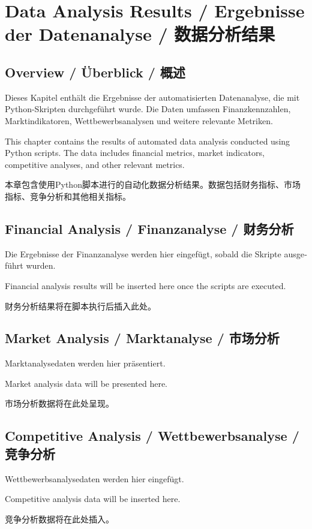 \chapter{Data Analysis Results / Ergebnisse der Datenanalyse / 数据分析结果}

\section{Overview / Überblick / 概述}

\begin{otherlanguage}{ngerman}
Dieses Kapitel enthält die Ergebnisse der automatisierten Datenanalyse, die mit Python-Skripten durchgeführt wurde. Die Daten umfassen Finanzkennzahlen, Marktindikatoren, Wettbewerbsanalysen und weitere relevante Metriken.
\end{otherlanguage}

This chapter contains the results of automated data analysis conducted using Python scripts. The data includes financial metrics, market indicators, competitive analyses, and other relevant metrics.

本章包含使用Python脚本进行的自动化数据分析结果。数据包括财务指标、市场指标、竞争分析和其他相关指标。

\section{Financial Analysis / Finanzanalyse / 财务分析}

\begin{otherlanguage}{ngerman}
Die Ergebnisse der Finanzanalyse werden hier eingefügt, sobald die Skripte ausgeführt wurden.
\end{otherlanguage}

Financial analysis results will be inserted here once the scripts are executed.

财务分析结果将在脚本执行后插入此处。

\section{Market Analysis / Marktanalyse / 市场分析}

\begin{otherlanguage}{ngerman}
Marktanalysedaten werden hier präsentiert.
\end{otherlanguage}

Market analysis data will be presented here.

市场分析数据将在此处呈现。

\section{Competitive Analysis / Wettbewerbsanalyse / 竞争分析}

\begin{otherlanguage}{ngerman}
Wettbewerbsanalysedaten werden hier eingefügt.
\end{otherlanguage}

Competitive analysis data will be inserted here.

竞争分析数据将在此处插入。
